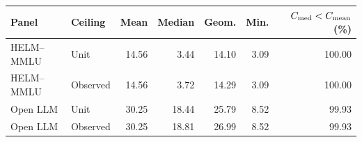 \begin{tabular}{llrrrrr}
\toprule
Panel & Ceiling & Mean & Median & Geom. & Min. & $C_{\rm med}<C_{\rm mean}$ (\%) \\
\midrule
HELM--MMLU & Unit & 14.56 & 3.44 & 14.10 & 3.09 & 100.00 \\
HELM--MMLU & Observed & 14.56 & 3.72 & 14.29 & 3.09 & 100.00 \\
Open LLM & Unit & 30.25 & 18.44 & 25.79 & 8.52 & 99.93 \\
Open LLM & Observed & 30.25 & 18.81 & 26.99 & 8.52 & 99.93 \\
\bottomrule
\end{tabular}
